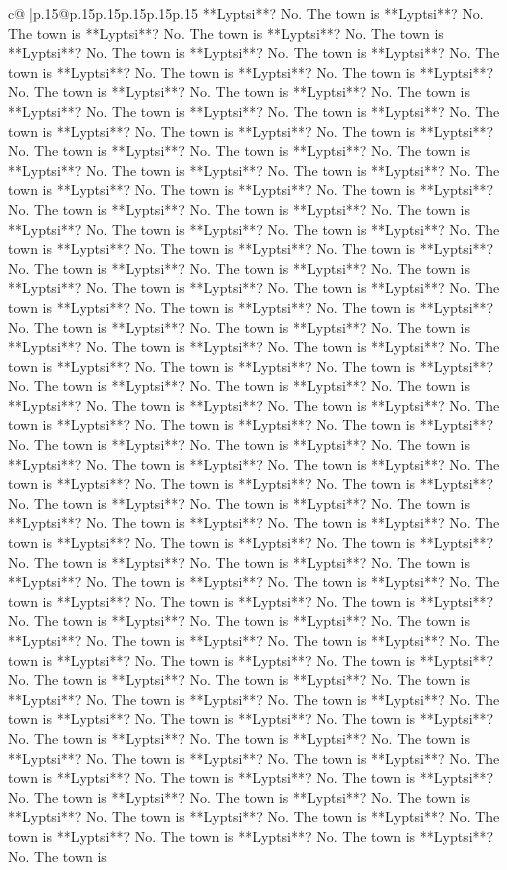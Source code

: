 \documentclass{article}
\begin{document}
{\begin{supertabular}{c@{$\;$}|p{.15\linewidth}@{}p{.15\linewidth}p{.15\linewidth}p{.15\linewidth}p{.15\linewidth}p{.15\linewidth}}
{{{**Lyptsi**? No. The town is **Lyptsi**? No. The town is **Lyptsi**? No. The town is **Lyptsi**? No. The town is **Lyptsi**? No. The town is **Lyptsi**? No. The town is **Lyptsi**? No. The town is **Lyptsi**? No. The town is **Lyptsi**? No. The town is **Lyptsi**? No. The town is **Lyptsi**? No. The town is **Lyptsi**? No. The town is **Lyptsi**? No. The town is **Lyptsi**? No. The town is **Lyptsi**? No. The town is **Lyptsi**? No. The town is **Lyptsi**? No. The town is **Lyptsi**? No. The town is **Lyptsi**? No. The town is **Lyptsi**? No. The town is **Lyptsi**? No. The town is **Lyptsi**? No. The town is **Lyptsi**? No. The town is **Lyptsi**? No. The town is **Lyptsi**? No. The town is **Lyptsi**? No. The town is **Lyptsi**? No. The town is **Lyptsi**? No. The town is **Lyptsi**? No. The town is **Lyptsi**? No. The town is **Lyptsi**? No. The town is **Lyptsi**? No. The town is **Lyptsi**? No. The town is **Lyptsi**? No. The town is **Lyptsi**? No. The town is **Lyptsi**? No. The town is **Lyptsi**? No. The town is **Lyptsi**? No. The town is **Lyptsi**? No. The town is **Lyptsi**? No. The town is **Lyptsi**? No. The town is **Lyptsi**? No. The town is **Lyptsi**? No. The town is **Lyptsi**? No. The town is **Lyptsi**? No. The town is **Lyptsi**? No. The town is **Lyptsi**? No. The town is **Lyptsi**? No. The town is **Lyptsi**? No. The town is **Lyptsi**? No. The town is **Lyptsi**? No. The town is **Lyptsi**? No. The town is **Lyptsi**? No. The town is **Lyptsi**? No. The town is **Lyptsi**? No. The town is **Lyptsi**? No. The town is **Lyptsi**? No. The town is **Lyptsi**? No. The town is **Lyptsi**? No. The town is **Lyptsi**? No. The town is **Lyptsi**? No. The town is **Lyptsi**? No. The town is **Lyptsi**? No. The town is **Lyptsi**? No. The town is **Lyptsi**? No. The town is **Lyptsi**? No. The town is **Lyptsi**? No. The town is **Lyptsi**? No. The town is **Lyptsi**? No. The town is **Lyptsi**? No. The town is **Lyptsi**? No. The town is **Lyptsi**? No. The town is **Lyptsi**? No. The town is **Lyptsi**? No. The town is **Lyptsi**? No. The town is **Lyptsi**? No. The town is **Lyptsi**? No. The town is **Lyptsi**? No. The town is **Lyptsi**? No. The town is **Lyptsi**? No. The town is **Lyptsi**? No. The town is **Lyptsi**? No. The town is **Lyptsi**? No. The town is **Lyptsi**? No. The town is **Lyptsi**? No. The town is **Lyptsi**? No. The town is **Lyptsi**? No. The town is **Lyptsi**? No. The town is **Lyptsi**? No. The town is **Lyptsi**? No. The town is **Lyptsi**? No. The town is **Lyptsi**? No. The town is **Lyptsi**? No. The town is **Lyptsi**? No. The town is **Lyptsi**? No. The town is **Lyptsi**? No. The town is **Lyptsi**? No. The town is **Lyptsi**? No. The town is **Lyptsi**? No. The town is **Lyptsi**? No. The town is **Lyptsi**? No. The town is **Lyptsi**? No. The town is **Lyptsi**? No. The town is **Lyptsi**? No. The town is **Lyptsi**? No. The town is **Lyptsi**? No. The town is **Lyptsi**? No. The town is **Lyptsi**? No. The town is **Lyptsi**? No. The town is **Lyptsi**? No. The town is **Lyptsi**? No. The town is **Lyptsi**? No. The town is **Lyptsi**? No. The town is **Lyptsi**? No. The town is }}}
\end{supertabular}}
\end{document}
